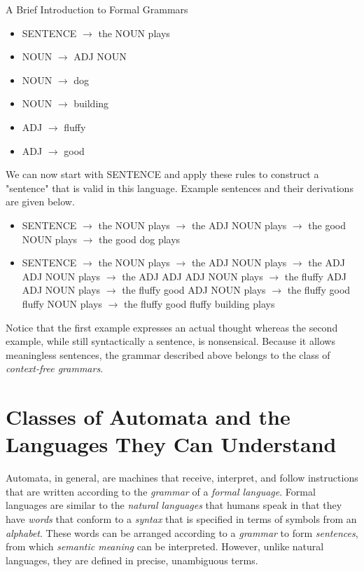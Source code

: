\begin{bluebox}{A Brief Introduction to Formal Grammars}
    \begin{itemize}
        \item SENTENCE $\rightarrow$ the NOUN plays
        \item NOUN $\rightarrow$ ADJ NOUN
        \item NOUN $\rightarrow$ dog
        \item NOUN $\rightarrow$ building
        \item ADJ $\rightarrow$ fluffy
        \item ADJ $\rightarrow$ good
    \end{itemize}
        
    We can now start with SENTENCE and apply these rules to construct a "sentence" that is valid in this language. Example sentences and their derivations are given below.
        
    \begin{itemize}
        \item SENTENCE $\rightarrow$ the NOUN plays $\rightarrow$ the ADJ NOUN plays $\rightarrow$ the good NOUN plays $\rightarrow$ the good dog plays
        \item SENTENCE $\rightarrow$ the NOUN plays $\rightarrow$ the ADJ NOUN plays $\rightarrow$ the ADJ ADJ NOUN plays $\rightarrow$ the ADJ ADJ ADJ NOUN plays $\rightarrow$ the fluffy ADJ ADJ NOUN plays $\rightarrow$ the fluffy good ADJ NOUN plays $\rightarrow$ the fluffy good fluffy NOUN plays $\rightarrow$ the fluffy good fluffy building plays
    \end{itemize}
        
    Notice that the first example expresses an actual thought whereas the second example, while still syntactically a sentence, is nonsensical. Because it allows meaningless sentences, the grammar described above belongs to the class of \textit{context-free grammars}.

\end{bluebox}

\section{Classes of Automata and the Languages They Can Understand}

Automata, in general, are machines that receive, interpret, and follow instructions that are written according to the \textit{grammar} of a \textit{formal language}. Formal languages are similar to the \textit{natural languages} that humans speak in that they have \textit{words} that conform to a \textit{syntax} that is specified in terms of symbols from an \textit{alphabet}. These words can be arranged according to a \textit{grammar} to form \textit{sentences}, from which \textit{semantic meaning} can be interpreted. However, unlike natural languages, they are defined in precise, unambiguous terms. \\

